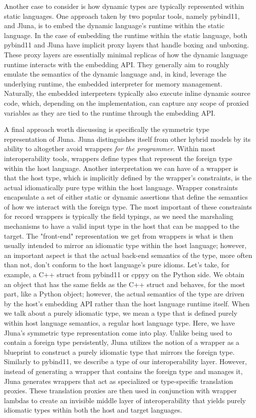 Another case to consider is how dynamic types are typically represented within static languages. One approach taken by two popular tools, namely pybind11, and Jluna, is to embed the dynamic language's runtime within the static language. In the case of embedding the runtime within the static language, both pybind11 and Jluna have implicit proxy layers that handle boxing and unboxing. These proxy layers are essentially minimal replicas of how the dynamic language runtime interacts with the embedding API. They generally aim to roughly emulate the semantics of the dynamic language and, in kind, leverage the underlying runtime,  \ie the embedded interpreter for memory management. Naturally, the embedded interpreters typically also execute inline dynamic source code, which, depending on the implementation, can capture any scope of proxied variables as they are tied to the runtime through the embedding API. 

A final approach worth discussing is specifically the symmetric type representation of Jluna. Jluna distinguishes itself from other hybrid models by its ability to altogether avoid wrappers \textit{for the programmer}. Within most interoperability tools, wrappers define types that represent the foreign type within the host language. Another interpretation we can have of a wrapper is that the host type, which is implicitly defined by the wrapper's constraints, is the actual idiomatically pure type within the host language. Wrapper constraints encapsulate a set of either static or dynamic assertions that define the semantics of how we interact with the foreign type. The most important of these constraints for record wrappers is typically the field typings, as we need the marshaling mechanisms to have a valid input type in the host that can be mapped to the target. The "front-end" representation we get from wrappers is what is then usually intended to mirror an idiomatic type within the host language; however, an important aspect is that the actual back-end semantics of the type, more often than not, don't conform to the host language's pure idioms. Let's take, for example, a C++ struct from pybind11 or cppyy on the Python side. We obtain an object that has the same fields as the C++ struct and behaves, for the most part, like a Python object; however, the actual semantics of the type are driven by the host's embedding API rather than the host language runtime itself. When we talk about a purely idiomatic type, we mean a type that is defined purely within host language semantics,  \ie a regular host language type. Here, we have Jluna's symmetric type representation come into play. Unlike being used to contain a foreign type persistently, Jluna utilizes the notion of a wrapper as a blueprint to construct a purely idiomatic type that mirrors the foreign type. Similarly to pybind11, we describe a type of our interoperability layer. However, instead of generating a wrapper that contains the foreign type and manages it, Jluna generates wrappers that act as specialized or type-specific translation proxies. These translation proxies are then used in conjunction with wrapper lambdas to create an invisible middle layer of interoperability that yields purely idiomatic types within both the host and target languages.    

